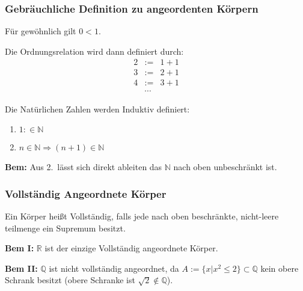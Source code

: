 \documentclass[12pt]{article}
\begin{document}
    \subsubsection{Gebräuchliche Definition zu angeordenten Körpern}
    Für gewöhnlich gilt $0<1$.

     Die Ordnungsrelation wird dann definiert durch:
    \begin{eqnarray*}
        2&:=& 1+1 \\
        3&:=& 2+1 \\
        4&:=&3+1 \\
        &\cdots&
    \end{eqnarray*}

     Die Natürlichen Zahlen werden Induktiv definiert:
    \begin{enumerate}
        \item $1 :\in \mathbb{N}$
        \item $n \in \mathbb{N} \Rightarrow (n+1)\in\mathbb{N}$
    \end{enumerate}

    \textbf{Bem:}
    Aus 2.\ lässt sich direkt ableiten das $\mathbb{N}$ nach oben unbeschränkt ist.

    \subsubsection{Vollständig Angeordnete Körper}
    Ein Körper heißt Vollständig, falls jede nach oben beschränkte, nicht-leere
    teilmenge ein Supremum besitzt.

    \textbf{Bem I:} $\mathbb{R}$ ist der einzige Vollständig angeordnete Körper.

    \textbf{Bem II:} $\mathbb{Q}$ ist nicht vollständig angeordnet, da
    $A := \{x | x^2 \leq 2\} \subset \mathbb{Q}$ kein obere Schrank besitzt
    (obere Schranke ist $\sqrt{2} \notin \mathbb{Q}$).
\end{document}
